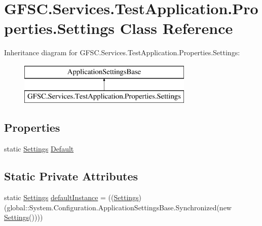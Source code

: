 \hypertarget{class_g_f_s_c_1_1_services_1_1_test_application_1_1_properties_1_1_settings}{}\section{G\+F\+S\+C.\+Services.\+Test\+Application.\+Properties.\+Settings Class Reference}
\label{class_g_f_s_c_1_1_services_1_1_test_application_1_1_properties_1_1_settings}
Inheritance diagram for G\+F\+S\+C.\+Services.\+Test\+Application.\+Properties.\+Settings\+:\begin{figure}[H]
\begin{center}
\leavevmode
\includegraphics[height=2.000000cm]{class_g_f_s_c_1_1_services_1_1_test_application_1_1_properties_1_1_settings}
\end{center}
\end{figure}
\subsection*{Properties}
\begin{DoxyCompactItemize}
\item 
static \mbox{\hyperlink{class_g_f_s_c_1_1_services_1_1_test_application_1_1_properties_1_1_settings}{Settings}} \mbox{\hyperlink{class_g_f_s_c_1_1_services_1_1_test_application_1_1_properties_1_1_settings_a332ab5639a8a97c4539877e1632f6dee}{Default}}
\end{DoxyCompactItemize}
\subsection*{Static Private Attributes}
\begin{DoxyCompactItemize}
\item 
static \mbox{\hyperlink{class_g_f_s_c_1_1_services_1_1_test_application_1_1_properties_1_1_settings}{Settings}} \mbox{\hyperlink{class_g_f_s_c_1_1_services_1_1_test_application_1_1_properties_1_1_settings_a8bfa835eefcf00f2a0b4c5a94f1c722d}{default\+Instance}} = ((\mbox{\hyperlink{class_g_f_s_c_1_1_services_1_1_test_application_1_1_properties_1_1_settings}{Settings}})(global\+::\+System.\+Configuration.\+Application\+Settings\+Base.\+Synchronized(new \mbox{\hyperlink{class_g_f_s_c_1_1_services_1_1_test_application_1_1_properties_1_1_settings}{Settings}}())))
\end{DoxyCompactItemize}


